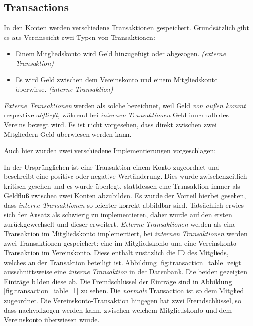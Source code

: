 \documentclass[a4paper, 11pt]{article}
\begin{document}
\subsection{Transactions}

In den Konten werden verschiedene Transaktionen gespeichert. Grundsätzlich gibt es aus Vereinssicht zwei Typen von Transaktionen:

\begin{itemize}
    \item Einem Mitgliedskonto wird Geld hinzugefügt oder abgezogen. \emph{(externe Transaktion)}
    \item Es wird Geld zwischen dem Vereinskonto und einem Mitgliedskonto überwiese. \emph{(interne Transaktion)}
\end{itemize}

\emph{Externe Transaktionen} werden als solche bezeichnet, weil Geld \emph{von
außen kommt} respektive \emph{abfließt}, während bei \emph{internen
Transaktionen} Geld innerhalb des Vereins bewegt wird. Es ist nicht vorgesehen,
dass direkt zwischen zwei Mitgliedern Geld überwiesen werden kann.

Auch hier wurden zwei verschiedene Implementierungen vorgeschlagen:

In der Ursprünglichen ist eine Transaktion einem Konto zugeordnet und
beschreibt eine positive oder negative Wertänderung. Dies wurde
zwischenzeitlich kritisch gesehen und es wurde überlegt, stattdessen eine
Transaktion immer als Geldfluß zwischen zwei Konten abzubilden. Es wurde der
Vorteil hierbei gesehen, dass \emph{interne Transaktionen} so leichter korrekt
abbildbar sind. Tatsächlich erwies sich der Ansatz als schwierig zu
implementieren, daher wurde auf den ersten zurückgewechselt und dieser
erweitert. \emph{Externe Transaktionen} werden als eine Transaktion im
Mitgliedskonto implementiert, bei \emph{internen Transaktionen} werden zwei
Transaktionen gespeichert: eine im Mitgliedskonto und eine
Vereinskonto-Transaktion im Vereinskonto. Diese enthält zusätzlich die ID des
Mitglieds, welches an der Transaktion beteiligt ist. Abbildung
\ref{fig:transaction_table} zeigt ausschnittsweise eine \emph{interne
Transaktion} in der Datenbank. Die beiden gezeigten Einträge bilden diese ab.
Die Fremdschlüssel der Einträge sind in Abbildung
\ref{fig:transaction_table_1} zu sehen. Die \emph{normale} Transaction ist so
dem Mitglied zugeordnet. Die Vereinskonto-Transaktion hingegen hat zwei
Fremdschlüssel, so dass nachvollzogen werden kann, zwischen welchem
Mitgliedskonto und dem Vereinskonto überwiesen wurde.
\end{document}
